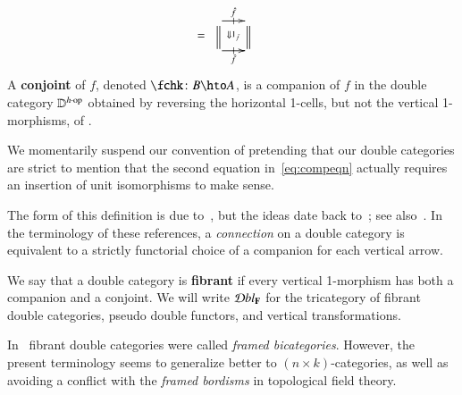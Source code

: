 \documentclass{amsart}
\begin{document}
\begin{defn}
\begin{align}
\begin{array}{c}
    \end{array} &=
    \begin{array}{c}
      \xymatrix@-.5pc{
        \ar[r]|-@{|}^-{\fhat} \ar@{=}[d] \ar@{}[dr]|{\Downarrow 1_{\fhat}}
        & \ar@{=}[d]\\
        \ar[r]|-@{|}_-{\fhat} & }
    \end{array}
  \end{align}
  A \textbf{conjoint} of $f$, denoted $\fchk\maps B\hto A$, is a
  companion of $f$ in the double category $\mathbb{D}^{h\cdot\mathrm{op}}$
  obtained by reversing the horizontal 1-cells, but not the vertical
  1-morphisms, of \lD.
\end{defn}

\begin{rmk}
  We momentarily suspend our convention of pretending that our double
  categories are strict to mention that the second
  equation in~\eqref{eq:compeqn} actually requires an insertion of unit
  isomorphisms to make sense.
\end{rmk}

The form of this definition is due
to~\cite{gp:double-adjoints,dpp:spans}, but the ideas date back
to~\cite{bs:dblgpd-xedmod}; see
also~\cite{bm:dbl-thin-conn,fiore:pscat}.  In the terminology of these
references, a \emph{connection} on a double category is equivalent to
a strictly functorial choice of a companion for each vertical arrow.

\begin{defn}
  We say that a double category is \textbf{fibrant} if every vertical
  1-morphism has both a companion and a conjoint. We will write $\mathcal{D}bl_{\bf F}$ for the tricategory of fibrant double categories, pseudo double functors, and vertical transformations.
\end{defn}



\begin{rmk}
  In~\cite{shulman:frbi} fibrant double categories were called
  \emph{framed bicategories}.  However, the present terminology seems
  to generalize better to $(n\times k)$-categories, as well as
  avoiding a conflict with the \emph{framed bordisms} in topological
  field theory.
\end{rmk}
\end{document}
